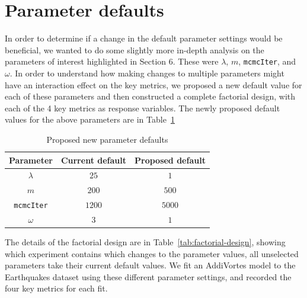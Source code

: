\documentclass[10pt]{article}
\begin{document}
\section{Parameter defaults}
 In order to determine if a change in the default parameter settings would be beneficial, we wanted to do some slightly more in-depth analysis on the parameters of interest highlighted in Section 6. These were $\lambda$, $m$, \texttt{mcmcIter}, and $\omega$. In order to understand how making changes to multiple parameters might have an interaction effect on the key metrics, we proposed a new default value for each of these parameters and then constructed a complete factorial design, with each of the 4 key metrics as response variables. The newly proposed default values for the above parameters are in Table~\ref{tab:param-new-defaults}
 \begin{table}[H]
\centering
\footnotesize
\begin{tabular}{ |c|c|c| }
\hline
\textbf{Parameter} & \textbf{Current default} & \textbf{Proposed default}\\
\hline
$\lambda$ & $25$ & $1$\\
$m$ & $200$ & $500$\\
\texttt{mcmcIter} & $1200$ & $5000$\\
$\omega$ & $3$ & $1$\\
\hline
\end{tabular}
\caption{Proposed new parameter defaults}
\label{tab:param-new-defaults}
\end{table}
The details of the factorial design are in Table~\ref{tab:factorial-design}, showing which experiment contains which changes to the parameter values, all unselected parameters take their current default values. We fit an AddiVortes model to the Earthquakes dataset using these different parameter settings, and recorded the four key metrics for each fit.
\end{document}
